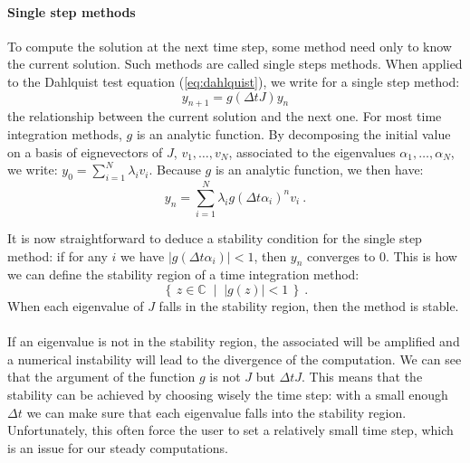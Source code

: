         \paragraph{Single step methods}
        To compute the solution at the next time step, some method need only to know the current solution.
        Such methods are called single steps methods.
        When applied to the Dahlquist test equation (\ref{eq:dahlquist}), we write for a single step method:
        \begin{equation}\label{eq:single_step}
          y_{n+1} = g\left(\Delta tJ\right)y_n
        \end{equation}
        the relationship between the current solution and the next one.
        For most time integration methods, $g$ is an analytic function.
        By decomposing the initial value on a basis of eignevectors of $J$, $v_1, \dots, v_N$, associated to the eigenvalues $\alpha_1, \dots, \alpha_N$, we write: $y_0 = \sum_{i=1}^N \lambda_i v_i$.
        Because $g$ is an analytic function, we then have:
        \begin{equation}
          y_n = \sum_{i=1}^N \lambda_i g\left(\Delta t \alpha_i\right)^n v_i \ .
        \end{equation}

        It is now straightforward to deduce a stability condition for the single step method: if for any $i$ we have $\left|g\left(\Delta t\alpha_i\right)\right| < 1$, then $y_n$ converges to 0.
        This is how we can define the stability region of a time integration method:
        \begin{equation}
          \left\{ \, z \in \mathbb{C} \; \mid \; \left| g\left(z\right) \right| < 1 \, \right\} \ .
        \end{equation}
        When each eigenvalue of $J$ falls in the stability region, then the method is stable.

        \paragraph{}
        If an eigenvalue is not in the stability region, the associated  will be amplified and a numerical instability will lead to the divergence of the computation.
        We can see that the argument of the function $g$ is not $J$ but $\Delta t J$.
        This means that the stability can be achieved by choosing wisely the time step: with a small enough $\Delta t$ we can make sure that each eigenvalue falls into the stability region.
        Unfortunately, this often force the user to set a relatively small time step, which is an issue for our steady computations.



